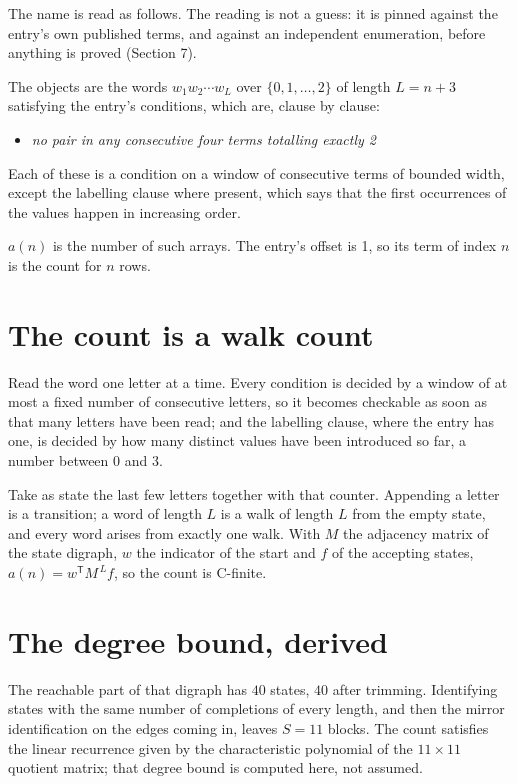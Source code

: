 \documentclass[11pt]{article}
\theoremstyle{definition}
\begin{document}
The name is read as follows. The reading is not a guess: it is pinned against the entry's own published terms, and against an independent enumeration, before anything is proved (Section 7).

The objects are the words $w_1 w_2 \cdots w_L$ over $\{0,1,\dots,2\}$ of length $L = n + 3$ satisfying the entry's conditions, which are, clause by clause:

\begin{itemize}

\item {\itshape no pair in any consecutive four terms totalling exactly 2}

\end{itemize}

Each of these is a condition on a window of consecutive terms of bounded width, except the labelling clause where present, which says that the first occurrences of the values happen in increasing order.

$a(n)$ is the number of such arrays. The entry's offset is 1, so its term of index $n$ is the count for $n$ rows.

\section{The count is a walk count}

Read the word one letter at a time. Every condition is decided by a window of at most a fixed number of consecutive letters, so it becomes checkable as soon as that many letters have been read; and the labelling clause, where the entry has one, is decided by how many distinct values have been introduced so far, a number between $0$ and 3.

Take as state the last few letters together with that counter. Appending a letter is a transition; a word of length $L$ is a walk of length $L$ from the empty state, and every word arises from exactly one walk. With $M$ the adjacency matrix of the state digraph, $w$ the indicator of the start and $f$ of the accepting states, $a(n) = w^{\mathsf T}M^{\,L}f$, so the count is C-finite.

\section{The degree bound, derived}

The reachable part of that digraph has $40$ states, $40$ after trimming. Identifying states with the same number of completions of every length, and then the mirror identification on the edges coming in, leaves $S = 11$ blocks. The count satisfies the linear recurrence given by the characteristic polynomial of the $11\times11$ quotient matrix; that degree bound is computed here, not assumed.
\end{document}
